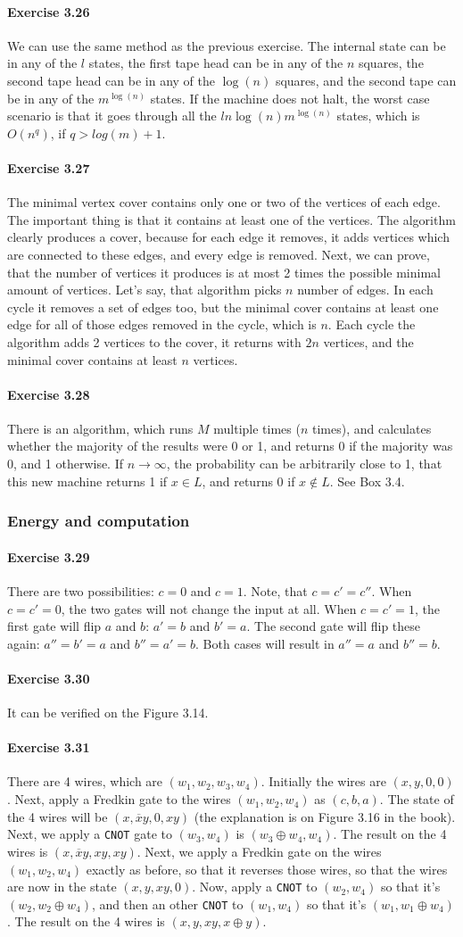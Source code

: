 \documentclass[a4paper,12pt]{article}
\newcommand{\exercise}[1]{\paragraph{Exercise #1}}
\begin{document}
    \exercise{3.26} We can use the same method as the previous exercise. The internal state can be in any of the $l$ states, the first tape head can be in any of the $n$ squares, the second tape head can be in any of the $\log(n)$ squares, and the second tape can be in any of the $m^{\log(n)}$ states. If the machine does not halt, the worst case scenario is that it goes through all the $l n \log(n) m^{\log(n)}$ states, which is $O(n^q)$, if $q > log(m)+1$.

    \exercise{3.27} \cite{warnow_cs_105} The minimal vertex cover contains only one or two of the vertices of each edge. The important thing is that it contains at least one of the vertices. The algorithm clearly produces a cover, because for each edge it removes, it adds vertices which are connected to these edges, and every edge is removed. Next, we can prove, that the number of vertices it produces is at most 2 times the possible minimal amount of vertices. Let's say, that algorithm picks $n$ number of edges. In each cycle it removes a set of edges too, but the minimal cover contains at least one edge for all of those edges removed in the cycle, which is $n$. Each cycle the algorithm adds 2 vertices to the cover, it returns with $2n$ vertices, and the minimal cover contains at least $n$ vertices.

    \exercise{3.28} There is an algorithm, which runs $M$ multiple times ($n$ times), and calculates whether the majority of the results were 0 or 1, and returns 0 if the majority was 0, and 1 otherwise. If $n \to \infty$, the probability can be arbitrarily close to 1, that this new machine returns 1 if $x \in L$, and returns 0 if $x \notin L$. See Box 3.4.

    \subsubsection{Energy and computation}

    \exercise{3.29} There are two possibilities: $c = 0$ and $c = 1$. Note, that $c = c' = c''$. When $c = c' = 0$, the two gates will not change the input at all. When $c = c' = 1$, the first gate will flip $a$ and $b$: $a' = b$ and $b' = a$. The second gate will flip these again: $a'' = b' = a$ and $b'' = a' = b$. Both cases will result in $a'' = a$ and $b'' = b$.

    \exercise{3.30} It can be verified on the Figure 3.14.

    \exercise{3.31} There are 4 wires, which are $(w_1, w_2, w_3, w_4)$. Initially the wires are $(x, y, 0, 0)$. Next, apply a Fredkin gate to the wires $(w_1, w_2, w_4)$ as $(c, b, a)$. The state of the 4 wires will be $(x, \overline{x}y, 0, xy)$ (the explanation is on Figure 3.16 in the book). Next, we apply a \texttt{CNOT} gate to $(w_3, w_4)$ is $(w_3 \oplus w_4, w_4)$. The result on the 4 wires is $(x, \overline{x}y, xy, xy)$. Next, we apply a Fredkin gate on the wires $(w_1, w_2, w_4)$ exactly as before, so that it reverses those wires, so that the wires are now in the state $(x, y, xy, 0)$. Now, apply a \texttt{CNOT} to $(w_2, w_4)$ so that it's $(w_2, w_2 \oplus w_4)$, and then an other \texttt{CNOT} to $(w_1, w_4)$ so that it's $(w_1, w_1 \oplus w_4)$. The result on the 4 wires is $(x, y, xy, x \oplus y)$.
\end{document}
